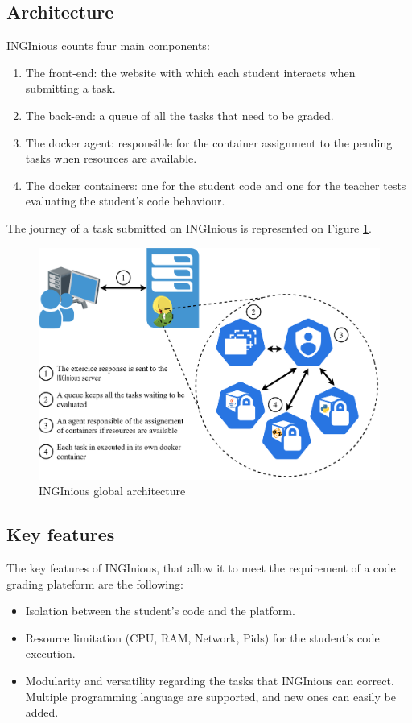 \subsection{Architecture}
INGInious counts four main components:
\begin{enumerate}
  \item The front-end: the website with which each student interacts when submitting a task.
  \item The back-end: a queue of all the tasks that need to be graded.
  \item The docker agent: responsible for the container assignment to the pending tasks when resources are available.
  \item The docker containers: one for the student code and one for the teacher tests evaluating the student's code behaviour.
\end{enumerate}
The journey of a task submitted on INGInious is represented on Figure \ref{fig:architecture}.
\begin{figure}[!h]
  \begin{center}
    \includegraphics[width=\linewidth]{images/Architecture.png}
    \caption{INGInious global architecture}
    \label{fig:architecture}
  \end{center}
\end{figure}

\subsection{Key features}
The key features of INGInious, that allow it to meet the requirement of a code grading plateform are the following:
\begin{itemize}
  \item Isolation between the student's code and the platform.
  \item Resource limitation (CPU, RAM, Network, Pids) for the student's code execution.
  \item Modularity and versatility regarding the tasks that INGInious can correct.  Multiple programming language are supported, and new ones can easily be added.
\end{itemize}

